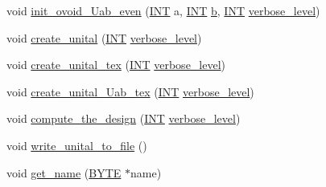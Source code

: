 \begin{DoxyCompactItemize}
\item 
void \mbox{\hyperlink{classbuekenhout__metz_ae2add9715f3b70bfb635fdb8d33bfa71}{init\+\_\+ovoid\+\_\+\+Uab\+\_\+even}} (\mbox{\hyperlink{galois_8h_a09fddde158a3a20bd2dcadb609de11dc}{I\+NT}} a, \mbox{\hyperlink{galois_8h_a09fddde158a3a20bd2dcadb609de11dc}{I\+NT}} \mbox{\hyperlink{alphabet2_8_c_a148e3876077787926724625411d6e7a9}{b}}, \mbox{\hyperlink{galois_8h_a09fddde158a3a20bd2dcadb609de11dc}{I\+NT}} \mbox{\hyperlink{simeon_8_c_a818073fbcc2f439e7c56952f67386122}{verbose\+\_\+level}})
\item 
void \mbox{\hyperlink{classbuekenhout__metz_a3bc240ccd9ac2bf7b73234d0ab48b224}{create\+\_\+unital}} (\mbox{\hyperlink{galois_8h_a09fddde158a3a20bd2dcadb609de11dc}{I\+NT}} \mbox{\hyperlink{simeon_8_c_a818073fbcc2f439e7c56952f67386122}{verbose\+\_\+level}})
\item 
void \mbox{\hyperlink{classbuekenhout__metz_a6c44e4063100cf3255f2e67326a33934}{create\+\_\+unital\+\_\+tex}} (\mbox{\hyperlink{galois_8h_a09fddde158a3a20bd2dcadb609de11dc}{I\+NT}} \mbox{\hyperlink{simeon_8_c_a818073fbcc2f439e7c56952f67386122}{verbose\+\_\+level}})
\item 
void \mbox{\hyperlink{classbuekenhout__metz_aa293e5c9781709f5bfcd4185481eced5}{create\+\_\+unital\+\_\+\+Uab\+\_\+tex}} (\mbox{\hyperlink{galois_8h_a09fddde158a3a20bd2dcadb609de11dc}{I\+NT}} \mbox{\hyperlink{simeon_8_c_a818073fbcc2f439e7c56952f67386122}{verbose\+\_\+level}})
\item 
void \mbox{\hyperlink{classbuekenhout__metz_a4256a0fe0a3ace089014a54f2cd6cab6}{compute\+\_\+the\+\_\+design}} (\mbox{\hyperlink{galois_8h_a09fddde158a3a20bd2dcadb609de11dc}{I\+NT}} \mbox{\hyperlink{simeon_8_c_a818073fbcc2f439e7c56952f67386122}{verbose\+\_\+level}})
\item 
void \mbox{\hyperlink{classbuekenhout__metz_adfe943268d648ae2f1f2654325b9ec34}{write\+\_\+unital\+\_\+to\+\_\+file}} ()
\item 
void \mbox{\hyperlink{classbuekenhout__metz_ad9396abddb3685ee0d4159cb7dd4e697}{get\+\_\+name}} (\mbox{\hyperlink{galois_8h_ab6cc7b4aeb6ea31aba2b3fbfc83ff5e6}{B\+Y\+TE}} $\ast$name)
\end{DoxyCompactItemize}
